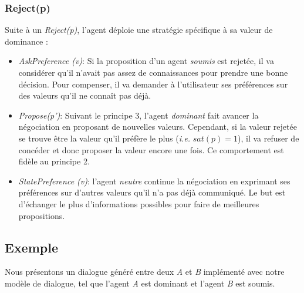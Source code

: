 	\subsubsection{Reject(p)}
	
	Suite à un \emph{Reject(p)}, l'agent déploie une stratégie spécifique à sa valeur de dominance :
	\begin{itemize}
		\item \emph{AskPreference (v)}: Si la proposition d'un agent \emph{soumis} est rejetée, il va considérer qu'il n'avait pas assez de connaissances pour prendre une bonne décision. Pour compenser, il va demander à l'utilisateur ses préférences sur des valeurs qu'il ne connaît pas déjà. 
		
		\item \emph{Propose(p')}: Suivant le principe 3, l'agent \emph{dominant} fait avancer la négociation en proposant de nouvelles valeurs. Cependant, si la valeur rejetée se trouve être la valeur qu'il préfère le plus (\textit{i.e.} $sat(p) =1$), il va refuser de concéder et donc proposer la valeur encore une fois. Ce comportement est fidèle au principe 2. 
		
		\item \emph{StatePreference (v)}: l'agent \emph{neutre} continue la négociation en exprimant ses préférences sur d'autres valeurs qu'il n'a pas déjà communiqué. Le but est d'échanger le plus d'informations possibles pour faire de meilleures propositions. 
	\end{itemize}	
	
	\subsection{Exemple}
	Nous présentons un dialogue généré entre deux \textit{A} et \textit{B} implémenté avec notre modèle de dialogue, tel que l'agent \textit{A} est dominant et l'agent \textit{B} est soumis. 



